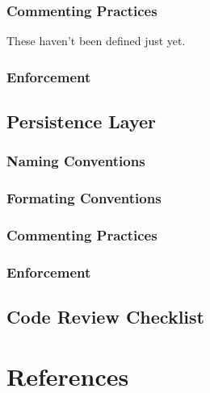 \documentclass[11pt]{article}
\begin{document}
\subsubsection{Commenting Practices}

These haven't been defined just yet.

\subsubsection{Enforcement}

\subsection{Persistence Layer}
\subsubsection{Naming Conventions}
\subsubsection{Formating Conventions}
\subsubsection{Commenting Practices}
\subsubsection{Enforcement}

\subsection{Code Review Checklist}


\section{References}


\end{document}
